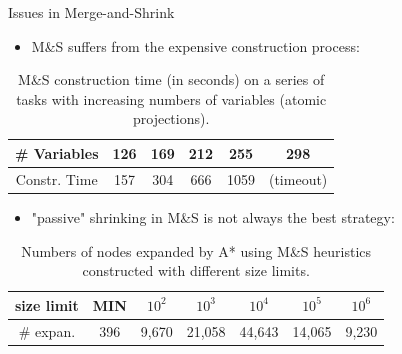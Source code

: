 \begin{myblock}{Issues in Merge-and-Shrink}
\Large
\begin{itemize}
\item M\&S suffers from the expensive construction process:
\end{itemize}

\begin{center}
\begin{minipage}{0.7\textwidth}
\begin{table}
\normalsize 
\centering
\begin{tabular}{|c|c|c|c|c|c|}
\hline\Tstrut
\# Variables & 126 & 169 & 212 & 255 & 298 \\
\hline\Tstrut
 Constr. Time & 157 & 304 & 666 & 1059 & (timeout)\\
\hline
\end{tabular}
\caption{
\normalsize  M\&S construction time (in seconds) on a series of tasks with increasing numbers of variables (atomic projections).}\end{table}
\end{minipage}
\end{center}

\begin{itemize}
\item "passive" shrinking in M\&S is not always the best strategy:
\end{itemize}

\begin{center}
\begin{minipage}{0.7\textwidth}
\begin{table}
\setlength\tabcolsep{5pt}
\centering
\normalsize
\begin{tabular}{|c|c|c|c|c|c|c|}
\hline\Tstrut %
 size limit & MIN & $10^2$ & $10^3$ & $10^4$ & $10^5$ & $10^6$ \\
\hline\Tstrut
 \# expan. & 396 & 9,670 & 21,058 & 44,643 & 14,065 & 9,230 \\
\hline
\end{tabular}
\caption{\normalsize Numbers of nodes expanded by A* using M\&S heuristics constructed with different size limits.}\label{example:2}
\end{table}
\end{minipage}
\end{center}


\end{myblock}

